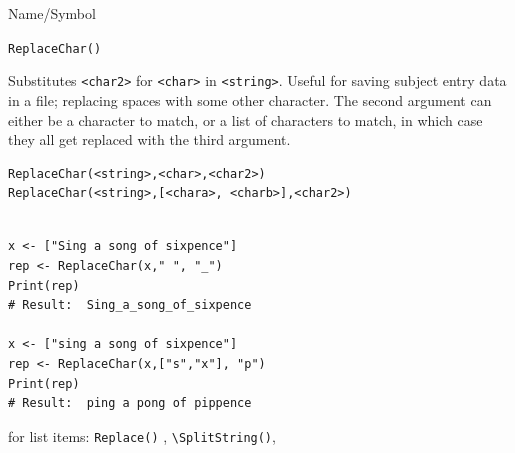 \begin{desc}{Name/Symbol}
\item[Name/Symbol]  \verb+ReplaceChar()+

\item[Description]  	Substitutes  \verb+<char2>+ for \verb+<char>+
  in \verb+<string>+. Useful for saving subject entry data in a file;
  replacing spaces with some other character.  The second argument can either be a character to match, or a list of characters to match, in which case they all get replaced with the third argument.

\item[Usage]        	
\begin{verbatim}
ReplaceChar(<string>,<char>,<char2>)
ReplaceChar(<string>,[<chara>, <charb>],<char2>)
\end{verbatim}
			  
\item[Example]     	
\begin{verbatim}

x <- ["Sing a song of sixpence"]
rep <- ReplaceChar(x," ", "_")
Print(rep)
# Result:  Sing_a_song_of_sixpence

x <- ["sing a song of sixpence"]
rep <- ReplaceChar(x,["s","x"], "p")
Print(rep)
# Result:  ping a pong of pippence
\end{verbatim}

\item[See Also]	
 for list items: \verb+Replace()+ , \verb+\SplitString()+, 
\end{desc}

